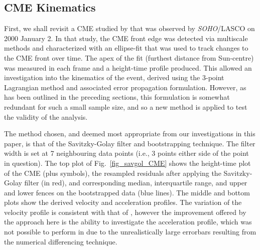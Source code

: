 \documentclass[structabstract]{aa}
\begin{document}
\subsection{CME Kinematics}
\label{subsect:corimp}


First, we shall revisit a CME studied by \citet{2009A&A...495..325B} that was observed by \emph{SOHO}/LASCO on 2000 January 2. In that study, the CME front edge was detected via multiscale methods and characterized with an ellipse-fit that was used to track changes to the CME front over time. The apex of the fit (furthest distance from Sun-centre) was measured in each frame and a height-time profile produced. This allowed an investigation into the kinematics of the event, derived using the 3-point Lagrangian method and associated error propagation formulation. However, as has been outlined in the preceding sections, this formulation is somewhat redundant for such a small sample size, and so a new method is applied to test the validity of the analysis.

The method chosen, and deemed most appropriate from our investigations in this paper, is that of the Savitzky-Golay filter and bootstrapping technique. The filter width is set at 7 neighbouring data points (i.e., 3 points either side of the point in question). The top plot of Fig.~\ref{fig_savgol_CME} shows the height-time plot of the CME (plus symbols), the resampled residuals after applying the Savitzky-Golay filter (in red), and corresponding median, interquartile range, and upper and lower fences on the bootstrapped data (blue lines). The middle and bottom plots show the derived velocity and acceleration profiles. The variation of the velocity profile is consistent with that of \citet{2009A&A...495..325B}, however the improvement offered by the approach here is the ability to investigate the acceleration profile, which was not possible to perform in \citet{2009A&A...495..325B} due to the unrealistically large errorbars resulting from the numerical differencing technique.
\end{document}
